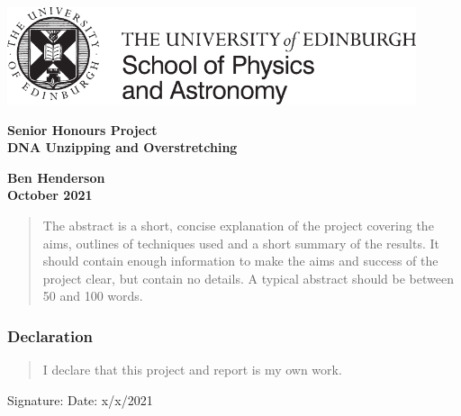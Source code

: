 \documentclass[a4paper,12pt]{article}
\begin{document}
\pagestyle{empty}                       %

\par\noindent\includegraphics[width=12cm]{PandA_crest.pdf}

\par\noindent                                           %
\vspace*{2cm}
\begin{center}
        \Large\bf \Large\bf Senior Honours Project\\
        \LARGE\bf DNA Unzipping and Overstretching
\end{center}
\vspace*{0.5cm}
\begin{center}
        \bf Ben Henderson\\                               %
        October 2021                                   %
\end{center}
\vspace*{5mm}
%
\begin{abstract}
        The abstract is a short, concise explanation of the project
        covering the aims, outlines of techniques used and a short
        summary of the results. It should contain enough information to
        make the aims and success of the project clear, but contain no details.
        A typical abstract should be between 50 and 100 words.
\end{abstract}

\vspace*{1cm}

\subsubsection*{Declaration}

\begin{quotation}
  I declare that this project and report is my own work.
\end{quotation}

\vspace*{2cm}
Signature: \hspace*{8cm}Date:  x/x/2021   \par\medskip   
                                                 
\end{document}
